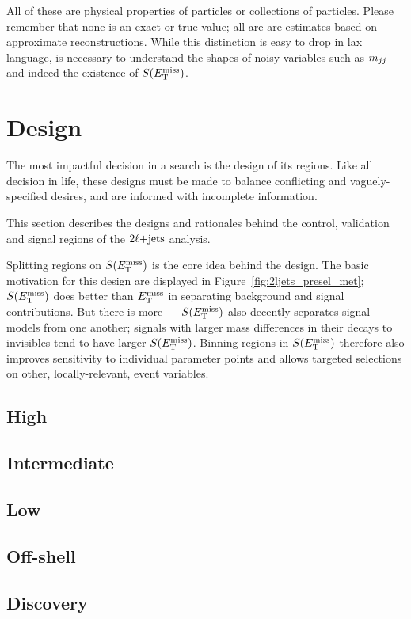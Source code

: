 All of these are physical properties of particles or collections of particles.
Please remember that none is an exact or true value;
all are are estimates based on approximate reconstructions.
While this distinction is easy to drop in lax language, is necessary to
understand the shapes of noisy variables such as $m_{jj}$ and indeed the
existence of $S(E_\mathrm{T}^\mathrm{miss})$.


\FloatBarrier
\section{Design}
The most impactful decision in a search is the design of its regions.
Like all decision in life, these designs must be made to balance conflicting
and vaguely-specified desires, and are informed with incomplete information.

This section describes the designs and rationales behind the control, validation
and signal regions of the $2\ell\mathrm{+jets}$ analysis.


Splitting regions on $S(E_\mathrm{T}^\mathrm{miss})$ is the core idea behind the design.
The basic motivation for this design are displayed in
Figure~\ref{fig:2ljets_presel_met};
$S(E_\mathrm{T}^\mathrm{miss})$ does better than $E_\mathrm{T}^\mathrm{miss}$ in separating background and signal
contributions.
But there is more --- $S(E_\mathrm{T}^\mathrm{miss})$ also decently separates signal models from one
another;
signals with larger mass differences in their decays to invisibles tend to have
larger $S(E_\mathrm{T}^\mathrm{miss})$.
Binning regions in $S(E_\mathrm{T}^\mathrm{miss})$ therefore also improves sensitivity to
individual parameter points and allows targeted selections on other, locally-relevant,
event variables.


\subsection{High}

\subsection{Intermediate}

\subsection{Low}

\subsection{Off-shell}

\subsection{Discovery}

